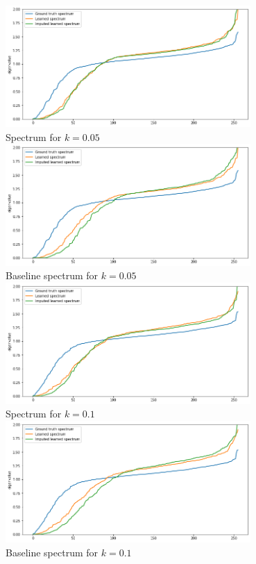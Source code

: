 \documentclass[a4paper]{article}
\begin{document}
\begin{center}
\includegraphics[width=0.70\textwidth]{images/p1/5_percent_own_spectrum.png}\\
Spectrum for $k = 0.05$\\
\includegraphics[width=0.70\textwidth]{images/p1/5_percent_baseline_spectrum.png}\\
Baseline spectrum for $k = 0.05$\\
\includegraphics[width=0.70\textwidth]{images/p1/10_percent_own_spectra.png}\\
Spectrum for $k = 0.1$\\
\includegraphics[width=0.70\textwidth]{images/p1/10_percent_baseline_spectra.png}\\
Baseline spectrum for $k = 0.1$\\
\end{center}
\end{document}
